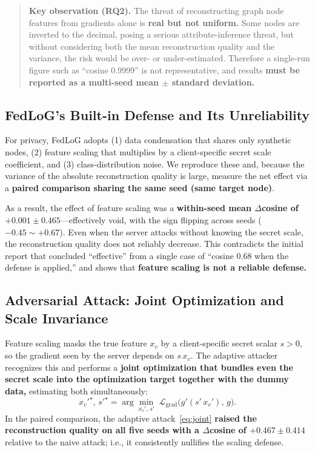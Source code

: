 \documentclass[conference]{IEEEtran}
\begin{document}
\begin{quotation}
\noindent\textbf{Key observation (RQ2).} The threat of reconstructing graph node
features from gradients alone is \textbf{real but not uniform.} Some nodes are
inverted to the decimal, posing a serious attribute-inference threat, but without
considering both the mean reconstruction quality and the variance, the risk would
be over- or under-estimated. Therefore a single-run figure such as ``cosine
0.9999'' is not representative, and results \textbf{must be reported as a
multi-seed mean $\pm$ standard deviation.}
\end{quotation}

\subsection{FedLoG's Built-in Defense and Its Unreliability}
For privacy, FedLoG adopts (1) data condensation that shares only synthetic
nodes, (2) feature scaling that multiplies by a client-specific secret scale
coefficient, and (3) class-distribution noise. We reproduce these and, because
the variance of the absolute reconstruction quality is large, measure the net
effect via a \textbf{paired comparison sharing the same seed (same target
node)}.

As a result, the effect of feature scaling was a \textbf{within-seed mean
$\Delta$cosine of $+0.001\pm0.465$}---effectively void, with the sign flipping
across seeds ($-0.45 \sim +0.67$). Even when the server attacks without knowing
the secret scale, the reconstruction quality does not reliably decrease. This
contradicts the initial report that concluded ``effective'' from a single case
of ``cosine 0.68 when the defense is applied,'' and shows that \textbf{feature
scaling is not a reliable defense.}

\subsection{Adversarial Attack: Joint Optimization and Scale Invariance}
Feature scaling masks the true feature $x_v$ by a client-specific secret scalar
$s>0$, so the gradient seen by the server depends on $s\,x_v$. The adaptive
attacker recognizes this and performs a \textbf{joint optimization that bundles
even the secret scale into the optimization target together with the dummy data,}
estimating both simultaneously:
\begin{equation}
x_v'^\star,\,s'^\star=\arg\min_{x_v',\,s'}\;
\mathcal{L}_{\mathrm{grad}}\!\big(g'(s'\,x_v'),\,g\big) .
\label{eq:joint}
\end{equation}
In the paired comparison, the adaptive attack~\eqref{eq:joint} \textbf{raised the
reconstruction quality on all five seeds with a $\Delta$cosine of
$+0.467\pm0.414$} relative to the naive attack; i.e., it consistently nullifies
the scaling defense.
\end{document}
